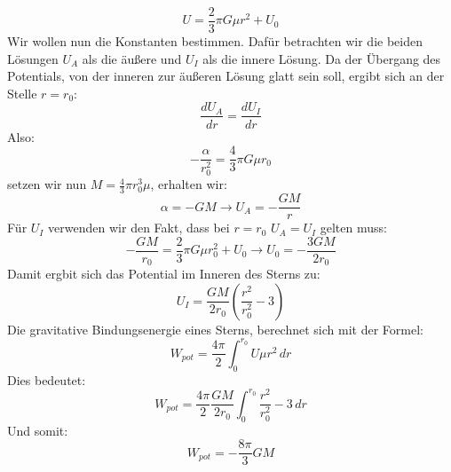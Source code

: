 \documentclass[a4paper]{article}
\begin{document}
\begin{equation}
    U=\frac{2}{3}\pi G\mu r^2+U_0
\end{equation}
Wir wollen nun die Konstanten bestimmen. Dafür betrachten wir die beiden Lösungen $U_A$ als die äußere und $U_I$ als die innere Lösung. Da der Übergang des Potentials, von der inneren zur äußeren Lösung glatt sein soll, ergibt sich an der Stelle $r=r_0$:
\begin{equation}
    \frac{dU_A}{dr}=\frac{dU_I}{dr}
\end{equation}
Also:
\begin{equation}
    -\frac{\alpha}{r_0^2}=\frac{4}{3}\pi G\mu r_0
\end{equation}
setzen wir nun $M=\frac{4}{3}\pi r_0^3\mu$, erhalten wir:
\begin{equation}
    \alpha=-GM\rightarrow U_A=-\frac{GM}{r}
\end{equation}
Für $U_I$ verwenden wir den Fakt, dass bei $r=r_0$ $U_A=U_I$ gelten muss:
\begin{equation}
    -\frac{GM}{r_0}=\frac{2}{3}\pi G\mu r_0^2+U_0\rightarrow U_0=-\frac{3GM}{2r_0}
\end{equation}
Damit ergbit sich das Potential im Inneren des Sterns zu:
\begin{equation}
    U_I=\frac{GM}{2r_0}(\frac{r^2}{r_0^2}-3)
\end{equation}
Die gravitative Bindungsenergie eines Sterns, berechnet sich mit der Formel:
\begin{equation}
    W_{pot}=\frac{4\pi}{2}\int_{0}^{r_0} U\mu r^2\, dr
\end{equation}
Dies bedeutet:
\begin{equation}
    W_{pot}=\frac{4\pi}{2}\frac{GM}{2r_0}\int_{0}^{r_0} \frac{r^2}{r_0^2}-3\, dr
\end{equation}
Und somit:
\begin{equation}
    W_{pot}=-\frac{8\pi}{3}GM
\end{equation}
\newline










\nocite{meinel}
\nocite{piotr}
\nocite{oloff}
\printbibliography
\end{document}

